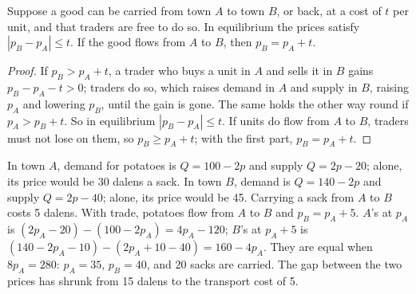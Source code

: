 \begin{proposition}\label{prop:g10:what-prices-do:band}
Suppose a good can be carried from town $A$ to town $B$, or back, at a cost of $t$ per unit, and that traders are free to do so. In equilibrium the prices
satisfy $|p_B - p_A| \le t$. If the good flows from $A$ to $B$, then $p_B = p_A + t$.
\end{proposition}
\begin{proof}
If $p_B > p_A + t$, a trader who buys a unit in $A$ and sells it in $B$ gains $p_B - p_A - t > 0$; traders do so, which raises demand in $A$ and supply in
$B$, raising $p_A$ and lowering $p_B$, until the gain is gone. The same holds the other way round if $p_A > p_B + t$. So in equilibrium $|p_B - p_A| \le t$.
If units do flow from $A$ to $B$, traders must not lose on them, so $p_B \ge p_A + t$; with the first part, $p_B = p_A + t$.
\end{proof}

\begin{example}\label{ex:g10:what-prices-do:two-towns}
In town $A$, demand for potatoes is $Q = 100 - 2p$ and supply $Q = 2p - 20$; alone, its price would be 30 dalens a sack. In town $B$, demand is $Q = 140 - 2p$
and supply $Q = 2p - 40$; alone, its price would be 45. Carrying a sack from $A$ to $B$ costs 5 dalens. With trade, potatoes flow from $A$ to $B$ and $p_B =
p_A + 5$. $A$'s  at $p_A$ is $(2p_A - 20) - (100 - 2p_A) = 4p_A - 120$; $B$'s  at $p_A + 5$ is $(140 - 2p_A - 10) - (2p_A + 10 - 40) =
160 - 4p_A$. They are equal when $8p_A = 280$: $p_A = 35$, $p_B = 40$, and 20 sacks are carried. The gap between the two prices has shrunk from 15 dalens to
the transport cost of 5.
\end{example}


